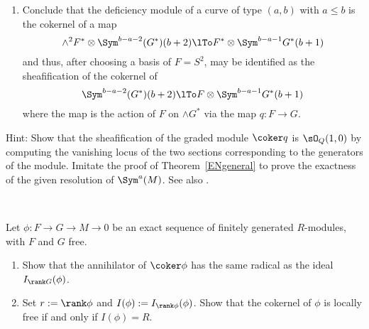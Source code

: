 \begin{exercise}
\begin{enumerate}
\item Conclude that the deficiency module of a curve of type $(a, b)$ with $a\leq b$ is the cokernel of a map
$$
\wedge^2 F^* \otimes \Sym^{b-a-2} (G^*)(b+2) \lTo F^*\otimes \Sym^{b-a-1} G^*(b+1)
$$
and thus, after choosing a basis of $F = S^2$, may be identified as the sheafification of the cokernel of
$$
\Sym^{b-a-2} (G^*)(b+2) \lTo F\otimes \Sym^{b-a-1} G^*(b+1)
$$
where the map is the action of $F$ on $\wedge G^*$ via the map $q: F\to G$.
\end{enumerate}
 Hint: Show that the sheafification of the graded module $\coker q$ is $\sO_Q(1,0)$ by computing the vanishing locus
of the two sections corresponding to the generators of the module. Imitate the proof of Theorem~\ref{ENgeneral} to prove
the exactness of the given resolution of $\Sym^a(M)$. See also \cite[Appendix A2.6]{Eisenbud1995}. 
\end{exercise}


\begin{exercise}~\label{Fitt}
 
 Let $\phi: F\to G \to M\to 0$ be an exact sequence of finitely generated $R$-modules, 
with $F$ and $G$ free. 

\begin{enumerate}

\item Show that the annihilator of  $\coker \phi$ has the
same radical as the ideal $I_{\rank G}(\phi)$.

 \item Set $r:= \rank \phi$ and  $I(\phi): = I_{\rank \phi}(\phi)$. Show that the cokernel of $\phi$
is locally free if and only if $I(\phi) = R$. 

\end{enumerate}
\end{exercise}






%
%
%
%
